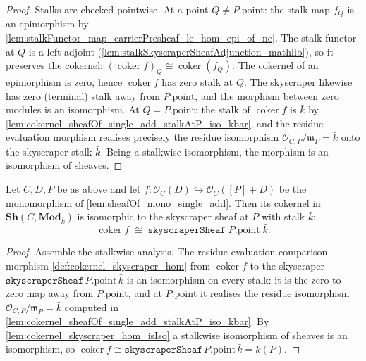 \begin{proof}
  Stalks are checked pointwise. At a point \(Q \neq P.\mathrm{point}\): the stalk
  map \(f_Q\) is an epimorphism by
  \cref{lem:stalkFunctor_map_carrierPresheaf_le_hom_epi_of_ne}. The stalk functor
  at \(Q\) is a left adjoint
  (\cref{lem:stalkSkyscraperSheafAdjunction_mathlib}), so it preserves the
  cokernel: \((\operatorname{coker} f)_Q \cong
  \operatorname{coker}(f_Q)\). The cokernel of an epimorphism is
  zero, hence \(\operatorname{coker} f\) has zero stalk at \(Q\). The skyscraper
  likewise has zero (terminal) stalk away from \(P.\mathrm{point}\), and the
  morphism between zero modules is an isomorphism. At \(Q = P.\mathrm{point}\): the stalk of \(\operatorname{coker}
  f\) is \(\bar k\) by
  \cref{lem:cokernel_sheafOf_single_add_stalkAtP_iso_kbar}, and the
  residue-evaluation morphism realises precisely the residue isomorphism
  \(\mathcal O_{C,P}/\mathfrak m_P = \bar k\) onto the skyscraper stalk
  \(\bar k\). Being a stalkwise isomorphism, the morphism is an isomorphism of
  sheaves.
\end{proof}

\begin{lemma}

  \label{lem:cokernel_sheafOf_single_add_iso_skyscraper}
  Let \(C, D, P\) be as above and let
  \(f : \mathcal O_C(D) \hookrightarrow \mathcal O_C([P]+D)\) be the
  monomorphism of \cref{lem:sheafOf_mono_single_add}. Then its cokernel in
  \(\mathbf{Sh}(C, \mathbf{Mod}_{\bar k})\) is isomorphic to the skyscraper
  sheaf at \(P\) with stalk \(\bar k\):
  \[
    \operatorname{coker} f \;\cong\;
    \texttt{skyscraperSheaf}\;P.\mathrm{point}\;\bar k.
  \]
\end{lemma}

\begin{proof}
  Assemble the stalkwise analysis. The residue-evaluation comparison morphism
  \cref{def:cokernel_skyscraper_hom} from \(\operatorname{coker} f\) to the
  skyscraper \(\texttt{skyscraperSheaf}\,P.\mathrm{point}\,\bar k\) is an
  isomorphism on every stalk: it is the zero-to-zero map away from
  \(P.\mathrm{point}\), and at \(P.\mathrm{point}\) it realises the residue
  isomorphism \(\mathcal O_{C,P}/\mathfrak m_P = \bar k\) computed in
  \cref{lem:cokernel_sheafOf_single_add_stalkAtP_iso_kbar}. By
  \cref{lem:cokernel_skyscraper_hom_isIso} a stalkwise isomorphism of sheaves is
  an isomorphism, so \(\operatorname{coker} f \cong
  \texttt{skyscraperSheaf}\,P.\mathrm{point}\,\bar k = k(P)\).
\end{proof}

